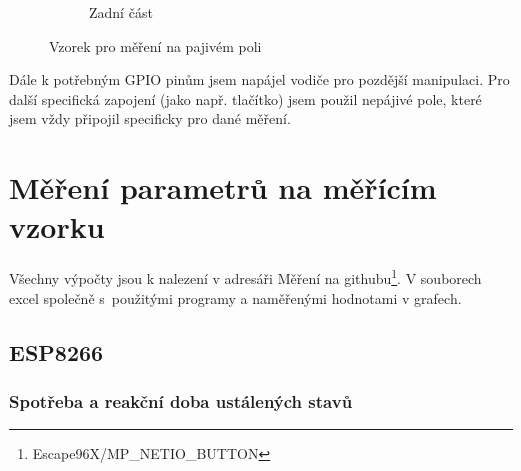 \documentclass[a4paper, 12pt]{report}
\begin{document}
\begin{figure}[h!]
\begin{subfigure}[b]{0.4\linewidth}
            \caption{Zadní část}
        \end{subfigure}
        \caption{Vzorek pro měření na pajivém poli}
        \label{fig:zapojeni_esp32_vzorek}
    \end{figure}\par
    Dále k potřebným GPIO pinům jsem napájel vodiče pro pozdější manipulaci.
    Pro další specifická zapojení (jako např. tlačítko) jsem použil nepájivé pole, které jsem vždy připojil specificky pro dané měření.





    \chapter{Měření parametrů na měřícím vzorku}
    Všechny výpočty jsou k nalezení v adresáři Měření na githubu\footnote{Escape96X/MP\_NETIO\_BUTTON}. V souborech excel společně s~použitými programy a naměřenými hodnotami v grafech.


    \section{ESP8266}

    \subsection{Spotřeba a reakční doba ustálených stavů}
\end{document}
